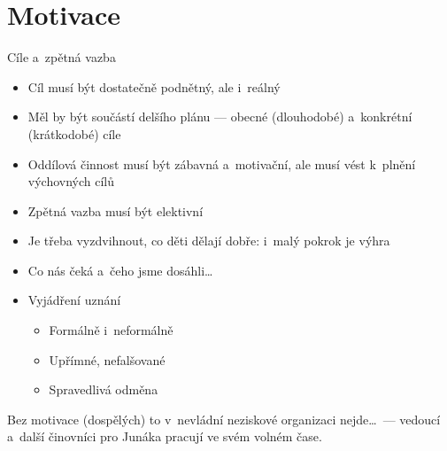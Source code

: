 \documentclass[hyperref={bookmarks=true, unicode=true, colorlinks=true, plainpages=false, pdfkeywords={Skaut, Junak, Skauting, Vychovna metoda}, linkcolor=OrangeRed, anchorcolor=OrangeRed, citecolor=RawSienna, filecolor=RawSienna, menucolor=OrangeRed, urlcolor=RawSienna, pdftex}, compress, xelatex, xcolor=dvipsnames, print]{beamer}
\begin{document}
\section{Motivace}

\begin{frame}{Cíle a~zpětná vazba}
\begin{multicols}{2}
\begin{itemize}
\item Cíl musí být dostatečně podnětný, ale i~reálný
\item Měl by být součástí delšího plánu --- obecné (dlouhodobé) a~konkrétní (krátkodobé) cíle
\item Oddílová činnost musí být zábavná a~motivační, ale musí vést k~plnění výchovných cílů
\end{itemize}
\columnbreak
\begin{itemize}
\item Zpětná vazba musí být elektivní
\item Je třeba vyzdvihnout, co děti dělají dobře: i~malý pokrok je výhra
\item Co nás čeká a~čeho jsme dosáhli\ldots
\item Vyjádření uznání
 \begin{itemize}
 \item Formálně i~neformálně
 \item Upřímné, nefalšované
 \item Spravedlivá odměna
 \end{itemize}
\end{itemize}
\end{multicols}
Bez motivace (dospělých) to v~nevládní neziskové organizaci nejde\ldots~--- vedoucí a~další činovníci pro Junáka pracují ve svém volném čase.
\end{frame}
\end{document}
